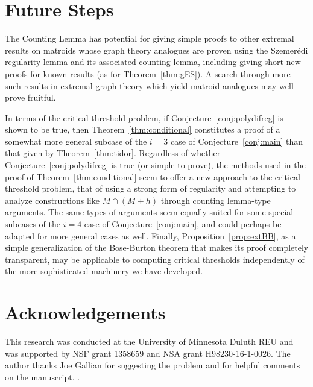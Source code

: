 \documentclass{article}
\theoremstyle{plain}
\theoremstyle{definition}
\theoremstyle{definition}
\theoremstyle{remark}
\numberwithin{equation}{section}
\begin{document}
\section{Future Steps}
The Counting Lemma has potential for giving simple proofs to other extremal results on matroids whose graph theory analogues are proven using the Szemerédi regularity lemma and its associated counting lemma, including giving short new proofs for known results (as for Theorem~\ref{thm:gES}). A search through more such results in extremal graph theory which yield matroid analogues may well prove fruitful.

In terms of the critical threshold problem, if Conjecture~\ref{conj:polydifreg} is shown to be true, then Theorem~\ref{thm:conditional} constitutes a proof of a somewhat more general subcase of the $i=3$ case of Conjecture~\ref{conj:main} than that given by Theorem~\ref{thm:tidor}. Regardless of whether Conjecture~\ref{conj:polydifreg} is true (or simple to prove), the methods used in the proof of Theorem~\ref{thm:conditional} seem to offer a new approach to the critical threshold problem, that of using a strong form of regularity and attempting to analyze constructions like $M\cap (M+h)$ through counting lemma-type arguments. The same types of arguments seem equally suited for some special subcases of the $i=4$ case of Conjecture~\ref{conj:main}, and could perhaps be adapted for more general cases as well. Finally, Proposition~\ref{prop:extBB}, as a simple generalization of the Bose-Burton theorem that makes its proof completely transparent, may be applicable to computing critical thresholds independently of the more sophisticated machinery we have developed.

\section*{Acknowledgements}
This research was conducted at the University of Minnesota Duluth REU and was supported by NSF grant 1358659 and NSA grant H98230-16-1-0026. The author thanks Joe Gallian for suggesting the problem and for helpful comments on the manuscript.
.





\end{document}

